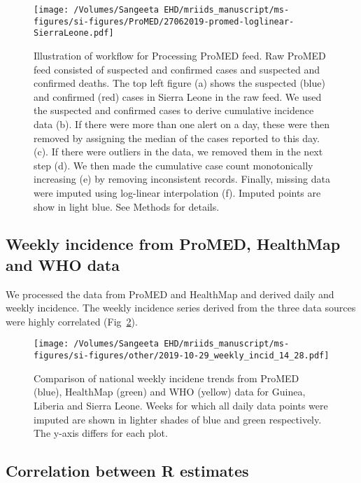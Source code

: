 \documentclass[9pt,twoside,lineno]{pnas-new}
\begin{document}
\begin{figure}
  \centering
  \texttt{[image: /Volumes/Sangeeta EHD/mriids\_manuscript/ms-figures/si-figures/ProMED/27062019-promed-loglinear-SierraLeone.pdf]}
  \caption{Illustration of workflow for Processing ProMED feed.
    Raw ProMED feed consisted of suspected and confirmed
    cases and suspected and confirmed
    deaths. The top left figure (a) shows the suspected (blue) and
    confirmed (red) cases in Sierra Leone in the raw feed.
    We used the suspected and confirmed cases to derive cumulative
    incidence data (b). If there were more than one alert on a day, 
    these were then removed
    by assigning the median of the cases reported to this day.
    (c).
    If there were outliers in the data, we removed them in the next step (d).
    We then made the cumulative case count monotonically increasing (e) by
    removing inconsistent records. Finally, missing data were imputed using
    log-linear interpolation (f). Imputed points are show in light blue.
    See Methods for details.}
\label{fig:dataclean}
\end{figure}\FloatBarrier

\subsection{Weekly incidence from ProMED, HealthMap and WHO data}

We processed the data from ProMED and HealthMap and derived daily and
weekly incidence. The weekly incidence series derived from the three
data sources were highly correlated (Fig~\ref{fig:weekly}).

\begin{figure}
  \centering
  \texttt{[image: /Volumes/Sangeeta EHD/mriids\_manuscript/ms-figures/si-figures/other/2019-10-29\_weekly\_incid\_14\_28.pdf]}
  \caption{Comparison of national weekly incidene trends from ProMED (blue),
    HealthMap (green) and WHO (yellow) data for Guinea, Liberia and
    Sierra Leone. Weeks for which all daily data points were imputed
    are shown in lighter shades of blue and green respectively. The
y-axis differs for each plot.}
\label{fig:weekly}
\end{figure}\FloatBarrier


\subsection{Correlation between R estimates}\label{correlation-between-r-estimates}
\end{document}
